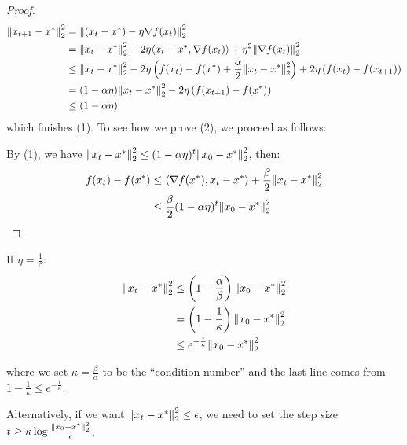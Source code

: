 \begin{proof}
    \begin{align*}
        \norm{x_{t+1} - x^*}_2^2 &= \norm{ (x_t - x^*) - \eta \nabla f(x_t)}_2^2 \\ 
        &= \norm{ x_t - x^*}_2^2 - 2 \eta \langle x_t - x^*, \nabla f(x_t) \rangle + \eta^2 
        \norm{ \nabla f(x_t) }_2^2 \\ 
        &\leq \norm{ x_t - x^*}_2^2 - 2 \eta \left( f(x_t) - f(x^*) + \frac{\alpha}{2}
        \norm{x_t - x^*}^2_2\right) + 2 \eta \left( f(x_t) - f(x_{t+1}) \right) \\ 
        &= (1 - \alpha \eta) \norm{x_t - x^*}_2^2 - 2 \eta \left( f(x_{t+1}) - f(x^*) \right) \\ 
        &\leq (1 - \alpha \eta)
    \end{align*}
    which finishes (1). To see how we prove (2), we proceed as follows: 

    By (1), we have \(\norm{x_t - x^*}_2^2 \leq (1 - \alpha \eta)^t \norm{x_0 - x^*}_2^2\), then: 
    \begin{align*}
        f(x_t) - f(x^*) &\leq \langle \nabla f(x^*), x_t - x^* \rangle + \frac{\beta}{2} \norm{x_t - x^*}_2^2 \\ 
        &\leq \frac{\beta}{2} (1 - \alpha \eta)^t \norm{x_0 - x^*}_2^2 
    \end{align*}
\end{proof}

\begin{remark}
    If \(\eta = \frac{1}{\beta}\): 
    \begin{align*}
        \norm{x_t - x^*}_2^2 &\leq \left(1 - \frac{\alpha}{\beta}\right) \norm{x_0 - x^*}_2^2 \\
        &= \left(1 - \frac{1}{\kappa}\right)  \norm{x_0 - x^*}_2^2 \\ 
        &\leq e^{- \frac{t}{\kappa}}  \norm{x_0 - x^*}_2^2
    \end{align*}

    where we set \(\kappa = \frac{\beta}{\alpha}\) to be the ``condition number'' and the last 
    line comes from \(1 - \frac{1}{\kappa} \leq e^{- \frac{1}{\kappa}}\). 

    Alternatively, if we want \( \norm{x_t - x^*}_2^2 \leq \epsilon\), we need to set 
    the step size \(t \geq \kappa \log \frac{\norm{x_0 - x^*}_2^2}{\epsilon}\). 
\end{remark}